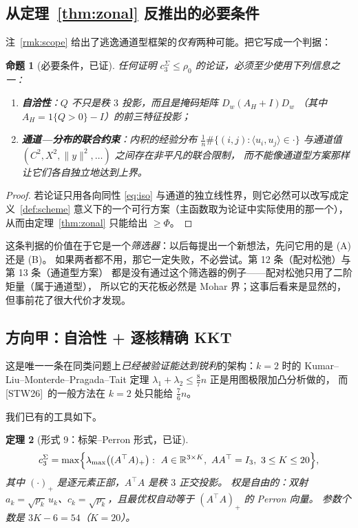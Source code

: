 \documentclass[UTF8,11pt]{ctexart}
\newtheorem{theorem}{定理}[section]
\newtheorem{proposition}[theorem]{命题}
\theoremstyle{definition}
\newcommand{\R}{\mathbb{R}}
\newcommand{\STW}{\textup{[STW26]}}
\begin{document}
\subsection{从定理~\ref{thm:zonal} 反推出的必要条件}

注~\ref{rmk:scope} 给出了逃逸通道型框架的\emph{仅有}两种可能。把它写成一个判据：

\begin{proposition}[必要条件，已证]\label{prop:nec}
任何证明 $c_3^{\Sigma}\le\rho_0$ 的论证，必须至少使用下列信息之一：
\begin{enumerate}[label=(\Alph*),leftmargin=2em]
\item \textbf{自洽性}：$Q$ 不只是秩 $3$ 投影，而且是掩码矩阵 $D_w(A_H+I)D_w$
（其中 $A_H=1\{Q>0\}-I$）的前三特征投影；
\item \textbf{通道—分布的联合约束}：内积的经验分布 $\frac1n\#\{(i,j):\langle u_i,u_j\rangle\in\cdot\}$
与通道值 $(C^2,X^2,\|y\|^2,\dots)$ 之间存在非平凡的\emph{联合}限制，
而不能像通道型方案那样让它们各自独立地达到上界。
\end{enumerate}
\end{proposition}

\begin{proof}
若论证只用各向同性 \eqref{eq:iso} 与通道的独立线性界，则它必然可以改写成定义~\ref{def:scheme}
意义下的一个可行方案（主函数取为论证中实际使用的那一个），从而由定理~\ref{thm:zonal} 只能给出 $\ge\Phi$。
\end{proof}

这条判据的价值在于它是一个\emph{筛选器}：以后每提出一个新想法，先问它用的是 (A) 还是 (B)。
如果两者都不用，那它一定失败，不必尝试。第 12 条（配对松弛）与第 13 条（通道型方案）
都是没有通过这个筛选器的例子——配对松弛只用了二阶矩量（属于通道型），
所以它的天花板必然是 Mohar 界；这事后看来是显然的，但事前花了很大代价才发现。

\subsection{方向甲：自洽性 + 逐核精确 KKT}

这是唯一一条在同类问题上\emph{已经被验证能达到锐利}的架构：$k=2$ 时的
Kumar--Liu--Monterde--\allowbreak Pragada--Tait 定理 $\lambda_1+\lambda_2\le\frac87n$ 正是用图极限加凸分析做的，
而 \STW\ 的一般方法在 $k=2$ 处只能给 $\frac76n$。

我们已有的工具如下。

\begin{theorem}[形式 9：标架--Perron 形式，已证]\label{thm:form9}
\[
c_3^{\Sigma}=\max\Bigl\{\lambda_{\max}\bigl((A^\top A)_+\bigr):\
A\in\R^{3\times K},\ AA^\top=I_3,\ 3\le K\le20\Bigr\},
\]
其中 $(\cdot)_+$ 是逐元素正部，$A^\top A$ 是秩 $3$ 正交投影。
权是\emph{自由}的：双射 $a_k=\sqrt{p_k}\,u_k$、$c_k=\sqrt{p_k}$，且最优权自动等于 $(A^\top A)_+$ 的 Perron 向量。
参数个数是 $3K-6=54$（$K=20$）。
\end{theorem}
\end{document}
